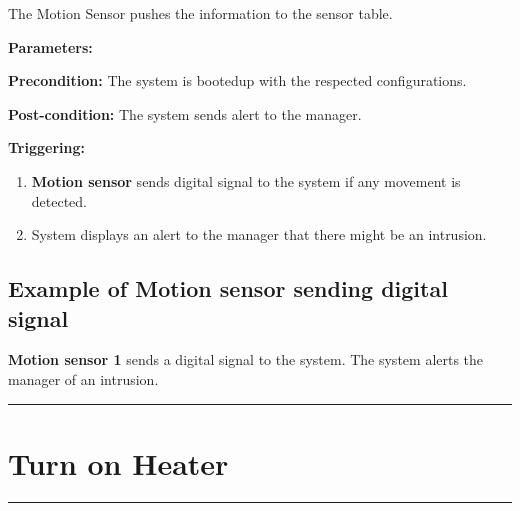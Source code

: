 The Motion Sensor pushes the information to the sensor table.
\begin{description}
\item \textbf{Parameters:} \
\item \textbf{Precondition:} The system is bootedup with the respected
configurations.
\item \textbf{Post-condition:} The system sends alert to the manager.

\item \textbf{Triggering:}
\begin{enumerate}
\item \textbf{Motion sensor} sends digital signal to the system if any movement
is detected.
\item System displays an alert to the manager that there might be an intrusion.
\end{enumerate}
\end{description}

\subsection{Example of Motion sensor sending digital signal}
\textbf{Motion sensor 1} sends a digital signal to the system. The system alerts
the manager of an intrusion.
\hfill
\vspace{0.5cm}
\hrule

\break



\section{Turn on Heater}

\hrule
\hfill
\vspace{0.5cm}
\label{operation:Turn on heater}

